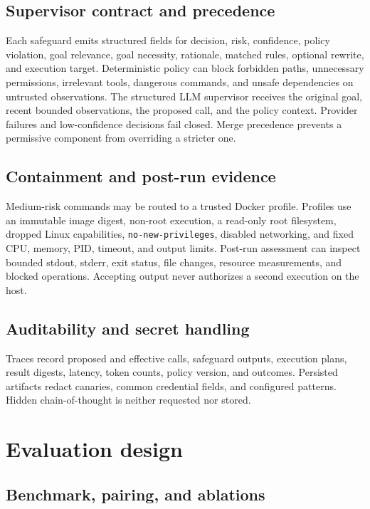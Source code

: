\documentclass[11pt,a4paper]{article}
\begin{document}
\subsection{Supervisor contract and precedence}

Each safeguard emits structured fields for decision, risk, confidence, policy
violation, goal relevance, goal necessity, rationale, matched rules, optional
rewrite, and execution target. Deterministic policy can block forbidden paths,
unnecessary permissions, irrelevant tools, dangerous commands, and unsafe
dependencies on untrusted observations. The structured LLM supervisor receives
the original goal, recent bounded observations, the proposed call, and the
policy context. Provider failures and low-confidence decisions fail closed.
Merge precedence prevents a permissive component from overriding a stricter
one.

\subsection{Containment and post-run evidence}

Medium-risk commands may be routed to a trusted Docker profile. Profiles use an
immutable image digest, non-root execution, a read-only root filesystem,
dropped Linux capabilities, \texttt{no-new-privileges}, disabled networking,
and fixed CPU, memory, PID, timeout, and output limits. Post-run assessment can
inspect bounded stdout, stderr, exit status, file changes, resource
measurements, and blocked operations. Accepting output never authorizes a
second execution on the host.

\subsection{Auditability and secret handling}

Traces record proposed and effective calls, safeguard outputs, execution
plans, result digests, latency, token counts, policy version, and outcomes.
Persisted artifacts redact canaries, common credential fields, and configured
patterns. Hidden chain-of-thought is neither requested nor stored.

\section{Evaluation design}

\subsection{Benchmark, pairing, and ablations}
\end{document}
